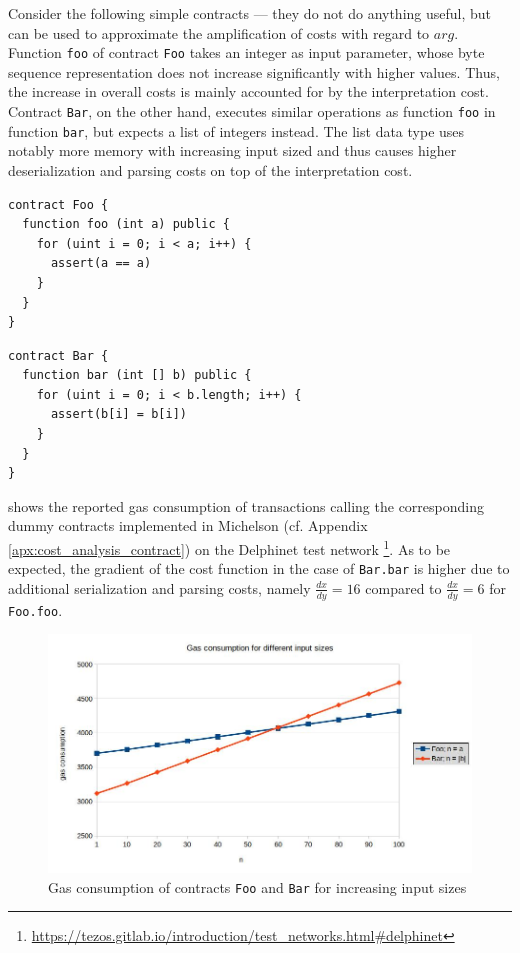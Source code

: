 Consider the following simple contracts --- they do not do anything useful, but can be used to approximate the amplification of costs with regard to $arg$. Function \texttt{foo} of contract \texttt{Foo} takes an integer as input parameter, whose byte sequence representation does not increase significantly with higher values. Thus, the increase in overall costs is mainly accounted for by the interpretation cost. Contract \texttt{Bar}, on the other hand, executes similar operations as function \texttt{foo} in function \texttt{bar}, but expects a list of integers instead. The list data type uses notably more memory with increasing input sized and thus causes higher deserialization and parsing costs on top of the interpretation cost. 
\begin{lstlisting}[numbers=none, language=Solidity, caption=Simple dummy contract expecting an integer and executing a loop]
contract Foo {
  function foo (int a) public {
    for (uint i = 0; i < a; i++) {
      assert(a == a)
    }
  }
}
\end{lstlisting}
\begin{lstlisting}[numbers=none, language=Solidity, caption=Simple dummy contract expecting iterating over a list]
contract Bar {
  function bar (int [] b) public {
    for (uint i = 0; i < b.length; i++) {
      assert(b[i] = b[i])
    }
  }
}
\end{lstlisting}

 shows the reported gas consumption of transactions calling the corresponding dummy contracts implemented in Michelson (cf. Appendix \ref{apx:cost_analysis_contract}) on the Delphinet test network \footnote{\url{https://tezos.gitlab.io/introduction/test_networks.html\#delphinet}}. As to be expected, the gradient of the cost function in the case of \texttt{Bar.bar} is higher due to additional serialization and parsing costs, namely $\frac{dx}{dy} = 16$ compared to $\frac{dx}{dy} = 6$ for \texttt{Foo.foo}.
\begin{figure}[h]
\centering
\includegraphics[width=0.9\linewidth]{figures/2-use_cases/cost_analysis}
\caption{Gas consumption of contracts \texttt{Foo} and \texttt{Bar} for increasing input sizes}
\label{fig:use_case_cost}
\vspace{128in}
\end{figure}

